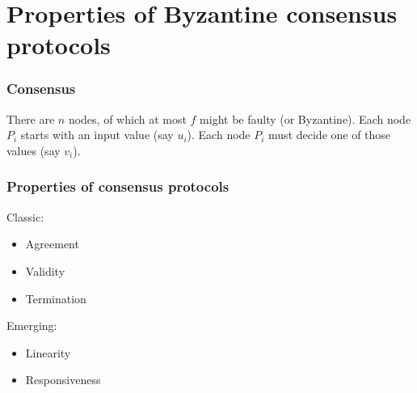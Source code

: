 \documentclass{beamer}
\begin{document}
\begin{frame}

\end{frame}


\section{Properties of Byzantine consensus protocols}


\begin{frame}
\frametitle{Consensus}


\begin{definition}[Consensus]
There are $n$ nodes, of which at most $f$ might be faulty (or Byzantine).
Each node $P_i$ starts with an input value (say $u_i$).
Each node $P_i$ must decide one of those values (say $v_i$).
\end{definition}

\end{frame}

\begin{frame}
    \frametitle{Properties of consensus protocols}

    Classic:

    \begin{itemize}
        \item Agreement
        \item Validity
        \item Termination
    \end{itemize}

    Emerging:

    \begin{itemize}
        \item Linearity
        \item Responsiveness
    \end{itemize}

\end{frame}
\end{document}
